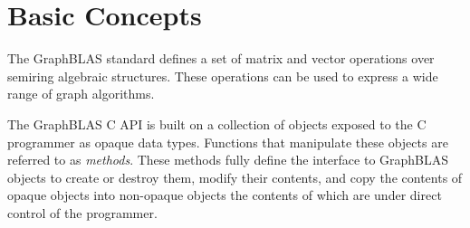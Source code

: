 \section{Basic Concepts}
\label{sec:concepts}

The GraphBLAS standard defines a set of matrix and vector operations 
over semiring algebraic structures.  These operations can be used
to express a wide range of graph algorithms.  

The GraphBLAS C API is built on a collection of objects exposed to 
the C programmer as opaque data types. Functions that manipulate these
objects are referred to as {\it methods}.  These methods fully define the 
interface to GraphBLAS objects to create or destroy them, modify their 
contents, and copy the contents of opaque objects into non-opaque objects the 
contents of which are under direct control of the programmer.

